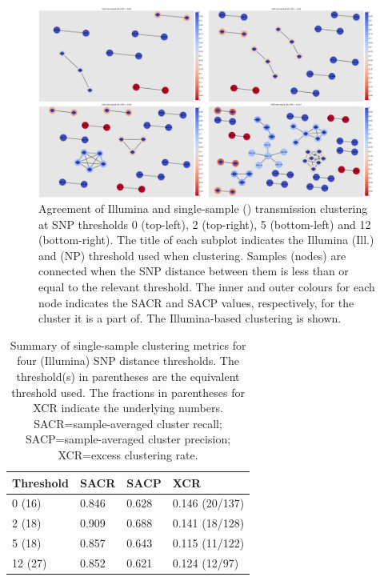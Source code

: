 \begin{figure}
\begin{center}
\includegraphics[width=0.90\columnwidth]{Chapter2/Figs/pandora_map_clusters.png}
\caption{{Agreement of Illumina and \pandora{} single-sample (\ont{}) transmission clustering at SNP
thresholds 0 (top-left), 2 (top-right), 5 (bottom-left) and 12 (bottom-right). The title of
each subplot indicates the Illumina (Ill.) and \ont{} (NP) threshold
used when clustering. Samples (nodes) are connected when the SNP
distance between them is less than or equal to the relevant threshold.
The inner and outer colours for each node indicates the SACR and SACP
values, respectively, for the cluster it is a part of. The
Illumina-based clustering is shown.
{\label{fig:map-clusters}}%
}}
\end{center}
\end{figure}

\begin{table}
\centering
\begin{tabular}{llll}
Threshold & SACR  & SACP  & XCR            \\
\hline
0 (16)    & 0.846 & 0.628 & 0.146 (20/137) \\
\hline
2 (18)    & 0.909 & 0.688 & 0.141 (18/128) \\
\hline
5 (18)    & 0.857 & 0.643 & 0.115 (11/122) \\
\hline
12 (27)   & 0.852 & 0.621 & 0.124 (12/97)  
\end{tabular}
\caption{Summary of \pandora{} single-sample clustering metrics for four (Illumina) SNP distance thresholds. The threshold(s) in parentheses are the \ont{} equivalent threshold used. The fractions in parentheses for XCR indicate the underlying numbers. SACR=sample-averaged cluster recall; SACP=sample-averaged cluster precision; XCR=excess clustering rate.}
\label{tab:map-cluster-summary}
\end{table}

